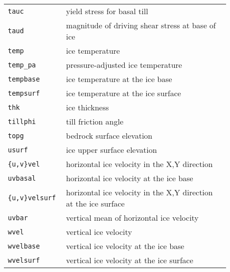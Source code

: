 \documentclass[landscape]{article}
\begin{document}
\begin{textblock}{15}
\begin{tabular}{@{}p{0.2\linewidth}p{0.7\linewidth}@{}}
  \texttt{tauc} &  yield stress for basal till \\
  \texttt{taud} &  magnitude of driving shear stress at base of ice \\
  \texttt{temp} &  ice temperature \\
  \texttt{temp_pa} &  pressure-adjusted ice temperature \\
  \texttt{tempbase} &  ice temperature at the ice base\\
  \texttt{tempsurf} &  ice temperature at the ice surface\\
  \texttt{thk} &  ice thickness\\
  \texttt{tillphi} &  till friction angle \\
  \texttt{topg} &  bedrock surface elevation \\
  \texttt{usurf} &  ice upper surface elevation \\
  \texttt{\{u,v\}vel} &  horizontal ice velocity in the X,Y direction \\
  \texttt{uvbasal} &  horizontal  ice velocity at the ice base\\
  \texttt{\{u,v\}velsurf} &  horizontal ice velocity in the X,Y direction
  at the ice surface\\
  \texttt{uvbar} &  vertical mean of horizontal ice velocity\\
  \texttt{wvel} &  vertical ice velocity \\
  \texttt{wvelbase} &  vertical ice velocity at the ice base\\
  \texttt{wvelsurf} &  vertical ice velocity at the ice surface\\
  \end{tabular}

\end{textblock}
\end{document}
